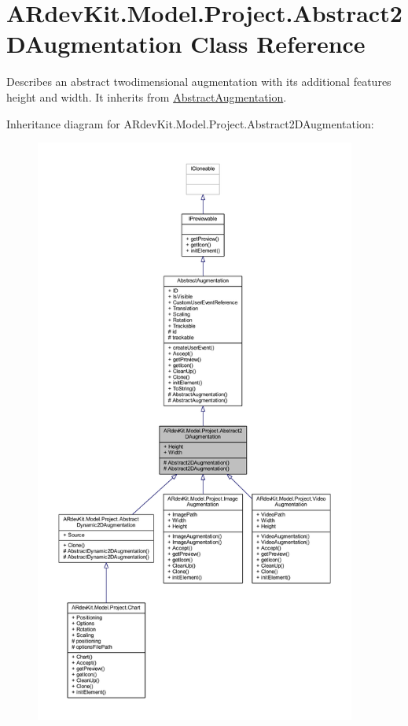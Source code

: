 \hypertarget{class_a_rdev_kit_1_1_model_1_1_project_1_1_abstract2_d_augmentation}{\section{A\-Rdev\-Kit.\-Model.\-Project.\-Abstract2\-D\-Augmentation Class Reference}
\label{class_a_rdev_kit_1_1_model_1_1_project_1_1_abstract2_d_augmentation}
}


Describes an abstract twodimensional augmentation with its additional features height and width. It inherits from \hyperlink{class_a_rdev_kit_1_1_model_1_1_project_1_1_abstract_augmentation}{Abstract\-Augmentation}.  




Inheritance diagram for A\-Rdev\-Kit.\-Model.\-Project.\-Abstract2\-D\-Augmentation\-:
\nopagebreak
\begin{figure}[H]
\begin{center}
\leavevmode
\includegraphics[height=550pt]{class_a_rdev_kit_1_1_model_1_1_project_1_1_abstract2_d_augmentation__inherit__graph}
\end{center}
\end{figure}


